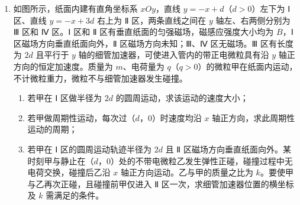 \documentclass[\gkver]{gaokaozhenti}
\begin{document}
\begin{enumerate}
{最大静摩擦力等于滑动摩擦力，即 $f = \mu N = 2\mu mg$

（2）当导体棒速度最大时，安培力等于最大静摩擦力，此时 U 形框即将滑动，导体棒切割磁感线产生的感应电动势 $E = Blv_{m}$

感应电流 $I = \frac{E}{R} = \frac{Blv_{m}}{R}$

安培力 $F_{\mathrm{A}} = BIl = \frac{B^{2}l^{2}v_{m}}{R}$

根据平衡条件有 $F_{\mathrm{A}} = f = 2\mu mg$

解得 $v_{m} = \frac{2\mu mgR}{B^{2}l^{2}}$

（3）设 U 形框的速度为 $u$，则导体棒与 U 形框的相对速度为 $v - u$，导体棒感应电动势 $E = Bl(v - u)$

感应电流 $I = \frac{Bl(v - u)}{R}$

导体棒受到的安培力 $F_{\mathrm{A}}' = \frac{B^{2}l^{2}(v - u)}{R}$

导体棒受到的安培力与 U 形框受到的安培力大小相等，对 U 形框受力分析有

$F_{\mathrm{A}}' = kx_{0} + 2\mu mg$

联立解得 $u = v - \frac{(kx_{0} + 2\mu mg)R}{B^{2}l^{2}}$

导体棒做匀速运动，对导体棒，根据平衡条件可得外力 $F = F_{\mathrm{A}}' = kx_{0} + 2\mu mg$

此时外力 $F$ 的功率 $P = Fv = (kx_{0} + 2\mu mg)v$
}
\item
如图所示，纸面内建有直角坐标系 $xOy$，直线 $y = -x + d$（$d > 0$）左下为 Ⅰ 区、直线 $y = -x + 3d$ 右上为 Ⅱ 区，两条直线之间在 $y$ 轴左、右两侧分别为 Ⅲ 区和 Ⅳ 区。Ⅰ 区和 Ⅱ 区有垂直纸面的匀强磁场，磁感应强度大小均为 $B$，Ⅰ 区磁场方向垂直纸面向外，Ⅱ 区磁场方向未知；Ⅲ、Ⅳ 区无磁场。Ⅲ 区有长度为 $2d$ 且平行于 $y$ 轴的细管加速器，可使进入管内的带正电微粒具有沿 $y$ 轴正方向的恒定加速度。质量为 $m$、电荷量为 $q$（$q > 0$）的微粒甲在纸面内运动，不计微粒重力，微粒不与细管加速器发生碰撞。
\begin{enumerate}
\item
若甲在 Ⅰ 区做半径为 $2d$ 的圆周运动，求该运动的速度大小；
\item
若甲做周期性运动，每次过（$d$，$0$）时速度均沿 $x$ 轴正方向，求此周期性运动的周期；
\item
若甲在 Ⅰ 区的圆周运动轨迹半径为 $2d$ 且 Ⅱ 区磁场方向垂直纸面向外。某时刻甲与静止在（$d$，$0$）处的不带电微粒乙发生弹性正碰，碰撞过程中无电荷交换，碰撞后乙沿 $x$ 轴正方向运动。乙与甲的质量之比为 $k$。要使甲与乙再次正碰，且碰撞前甲仅进入 Ⅱ 区一次，求细管加速器位置的横坐标及 $k$ 需满足的条件。
\end{enumerate}
\onepicture[w=5.5cm, align=right]{}


\end{enumerate}
\end{document}
